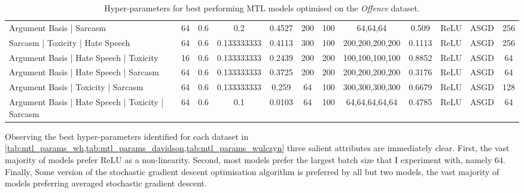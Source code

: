 \begin{landscape}
\begin{table}[]
{\begin{tabular}{l|ccccccccccc}
      Argument Basis | Sarcasm                          & 64         & 0.6              & 0.2              & 0.4527  & 200           & 100    & 64,64,64        & 0.509         & ReLU          & ASGD      & 256        \\
      Sarcasm | Toxicity | Hate Speech                  & 64         & 0.6              & 0.133333333      & 0.4113  & 300           & 100    & 200,200,200,200 & 0.1113        & ReLU          & ASGD      & 256        \\
      Argument Basis | Hate Speech | Toxicity           & 16         & 0.6              & 0.133333333      & 0.2439  & 200           & 200    & 100,100,100,100 & 0.8852        & ReLU          & ASGD      & 64         \\
      Argument Basis | Hate Speech | Sarcasm            & 64         & 0.6              & 0.133333333      & 0.3725  & 200           & 200    & 200,200,200,200 & 0.3176        & ReLU          & ASGD      & 64         \\
      Argument Basis | Toxicity | Sarcasm               & 64         & 0.6              & 0.133333333      & 0.259   & 64            & 100    & 300,300,300,300 & 0.6679        & ReLU          & ASGD      & 128        \\
      Argument Basis | Hate Speech | Toxicity | Sarcasm & 64         & 0.6              & 0.1              & 0.0103  & 64            & 100    & 64,64,64,64,64  & 0.4785        & ReLU          & ASGD      & 64
    \end{tabular}%
    }
    \caption{Hyper-parameters for best performing MTL models optimised on the \textit{Offence} dataset.}
    \label{tab:mtl_params_davidson}
  \end{table}
\end{landscape}

Observing the best hyper-parameters identified for each dataset in \cref{tab:mtl_params_wh,tab:mtl_params_davidson,tab:mtl_params_wulczyn} three salient attributes are immediately clear.
First, the vast majority of models prefer ReLU as a non-linearity.
Second, most models prefer the largest batch size that I experiment with, namely $64$.
Finally, Some version of the stochastic gradient descent optimisation algorithm is preferred by all but two models, the vast majority of models preferring averaged stochastic gradient descent.

